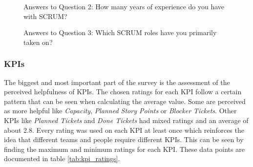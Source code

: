 \begin{figure}[!h]
    \centering
    \caption{Answers to Question 2: How many years of experience do you have with SCRUM?}
    \label{fig:scrum_experience_pie_chart}
\end{figure}

\begin{figure}
    \centering
    \caption{Answers to Question 3: Which SCRUM roles have you primarily taken on?}
    \label{fig:scrum_roles_bar_chart}
\end{figure}

\subsubsection{KPIs}

The biggest and most important part of the survey is the assessment 
of the perceived helpfulness of KPIs. 
The chosen ratings for each KPI follow a certain pattern that can be 
seen when calculating the average value. 
Some are perceived as more helpful like \textit{Capacity}, \textit{Planned Story Points} or \textit{Blocker Tickets}. 
Other KPIs like \textit{Planned Tickets} and \textit{Done Tickets} had mixed ratings and an average of about 2.8. 
Every rating was used on each KPI at least once which reinforces the idea that different teams and people require different KPIs. 
This can be seen by finding the maximum and minimum ratings for each KPI. 
These data points are documented in table \ref{tab:kpi_ratings}.

